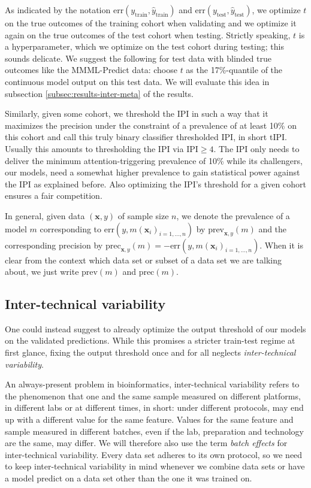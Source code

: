 As indicated by the notation $\text{err}(y_\text{train}, \hat{y}_\text{train})$ and 
$\text{err}(y_\text{test}, \hat{y}_\text{test})$, we optimize $t$ on the true outcomes 
of the training cohort when validating and we optimize it again on the true outcomes of the test cohort 
when testing. Strictly speaking, $t$ is a hyperparameter, which we optimize on the 
test cohort during testing; this sounds delicate. We suggest the following for test data with 
blinded true outcomes like the MMML-Predict data: choose $t$ as the 17\%-quantile of the continuous 
model output on this test data. We will evaluate this idea in subsection 
\ref{subsec:results-inter-meta} of the results.

Similarly, given some cohort, we threshold the IPI in such a way that it maximizes the precision under 
the constraint of a prevalence of at least \num{10}\% on this cohort and call this truly 
binary classifier thresholded IPI, in short tIPI. Usually this amounts to thresholding the IPI via 
$\text{IPI} \geq 4$. The IPI only needs to deliver the minimum 
attention-triggering prevalence of \num{10}\% while its challengers, our models, need a somewhat 
higher prevalence to gain statistical power against the IPI as explained before. Also optimizing 
the IPI's threshold for a given cohort ensures a fair competition.

In general, given data $(\mathbf{x}, y)$ of sample size $n$, we denote the prevalence of a model 
$m$ corresponding to 
$\text{err}(y, m(\mathbf{x}_i)_{i = 1, \ldots, n})$ by $\text{prev}_{\mathbf{x}, y}(m)$ and the corresponding 
precision by $\text{prec}_{\mathbf{x}, y}(m) = -\text{err}(y, m(\mathbf{x}_i)_{i = 1, \ldots, n})$. When it 
is clear from the context which data set or subset of a data set we are talking about, we just write 
$\text{prev}(m)$ and $\text{prec}(m)$.

\subsection{Inter-technical variability} 
One could instead suggest to already optimize the output threshold of our models on the validated 
predictions. While this promises a stricter train-test regime at first glance, fixing the output 
threshold once and for all neglects \textit{inter-technical variability}. 

An always-present problem in bioinformatics, inter-technical variability refers to the phenomenon 
that one and the same sample measured on different platforms, in different labs or at different times, 
in short: under different protocols, may end up with a different value for the same feature. 
Values for the same feature and sample measured in different batches, even if the lab, preparation 
and technology are the same, may differ. We will therefore also use the term \textit{batch effects} 
for inter-technical variability. Every data set adheres to its own protocol, so we need to keep
inter-technical variability in mind whenever we combine data sets or have a model predict on a 
data set other than the one it was trained on.

